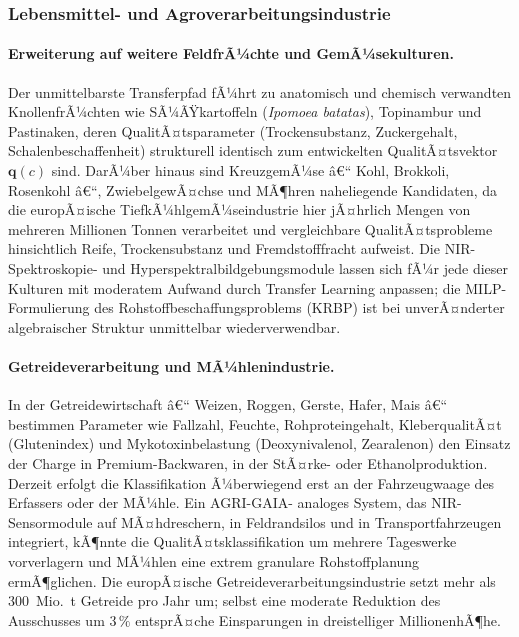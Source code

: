 ﻿\documentclass[12pt,a4paper]{article}
\theoremstyle{plain}
\theoremstyle{definition}
\begin{document}
	\subsubsection{Lebensmittel- und Agroverarbeitungsindustrie}

	\paragraph{Erweiterung auf weitere FeldfrÃ¼chte und GemÃ¼sekulturen.}
	Der unmittelbarste Transferpfad fÃ¼hrt zu anatomisch und chemisch verwandten
	KnollenfrÃ¼chten wie SÃ¼ÃŸkartoffeln (\textit{Ipomoea batatas}), Topinambur
	und Pastinaken, deren QualitÃ¤tsparameter (Trockensubstanz, Zuckergehalt,
	Schalenbeschaffenheit) strukturell identisch zum entwickelten QualitÃ¤tsvektor
	$\mathbf{q}(c)$ sind. DarÃ¼ber hinaus sind KreuzgemÃ¼se â€“ Kohl, Brokkoli,
	Rosenkohl â€“, ZwiebelgewÃ¤chse und MÃ¶hren naheliegende Kandidaten, da die
	europÃ¤ische TiefkÃ¼hlgemÃ¼seindustrie hier jÃ¤hrlich Mengen von mehreren
	Millionen Tonnen verarbeitet und vergleichbare QualitÃ¤tsprobleme hinsichtlich
	Reife, Trockensubstanz und Fremdstofffracht aufweist. Die NIR-Spektroskopie-
	und Hyperspektralbildgebungsmodule lassen sich fÃ¼r jede dieser Kulturen
	mit moderatem Aufwand durch Transfer Learning anpassen; die MILP-Formulierung
	des Rohstoffbeschaffungsproblems (KRBP) ist bei unverÃ¤nderter algebraischer
	Struktur unmittelbar wiederverwendbar.

	\paragraph{Getreideverarbeitung und MÃ¼hlenindustrie.}
	In der Getreidewirtschaft â€“ Weizen, Roggen, Gerste, Hafer, Mais â€“ bestimmen
	Parameter wie Fallzahl, Feuchte, Rohproteingehalt, KleberqualitÃ¤t
	(Glutenindex) und Mykotoxinbelastung (Deoxynivalenol, Zearalenon) den
	Einsatz der Charge in Premium-Back\-waren, in der StÃ¤rke- oder
	Ethanolproduktion. Derzeit erfolgt die Klassifikation Ã¼berwiegend
	erst an der Fahrzeugwaage des Erfassers oder der MÃ¼hle. Ein AGRI-GAIA-
	analoges System, das NIR-Sensor\-module auf MÃ¤hdreschern, in Feldrandsilos
	und in Transportfahrzeugen integriert, kÃ¶nnte die QualitÃ¤tsklassifikation
	um mehrere Tageswerke vorverlagern und MÃ¼hlen eine extrem granulare
	Rohstoffplanung ermÃ¶glichen. Die europÃ¤ische Getreideverarbeitungsindustrie
	setzt mehr als 300~Mio.~t Getreide pro Jahr um; selbst eine moderate
	Reduktion des Ausschusses um $3\,\%$ entsprÃ¤che Einsparungen in
	dreistelliger MillionenhÃ¶he.
\end{document}

